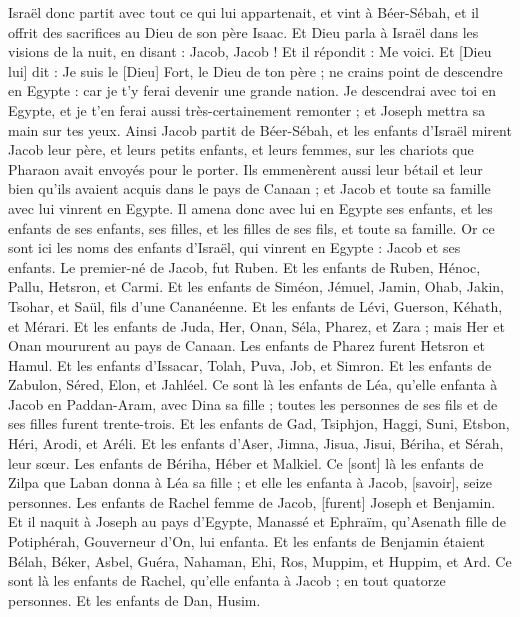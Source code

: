 \begin{multicols}{2}
\VerseOne{}Israël donc partit avec tout ce qui lui appartenait, et vint à Béer-Sébah, et il offrit des sacrifices au Dieu de son père Isaac.
Et Dieu parla à Israël dans les visions de la nuit, en disant : Jacob, Jacob ! Et il répondit : Me voici.
Et [Dieu lui] dit : Je suis le [Dieu] Fort, le Dieu de ton père ; ne crains point de descendre en Egypte : car je t'y ferai devenir une grande nation.
Je descendrai avec toi en Egypte, et je t'en ferai aussi très-certainement remonter ; et Joseph mettra sa main sur tes yeux.
Ainsi Jacob partit de Béer-Sébah, et les enfants d'Israël mirent Jacob leur père, et leurs petits enfants, et leurs femmes, sur les chariots que Pharaon avait envoyés pour le porter.
Ils emmenèrent aussi leur bétail et leur bien qu'ils avaient acquis dans le pays de Canaan ; et Jacob et toute sa famille avec lui vinrent en Egypte.
Il amena donc avec lui en Egypte ses enfants, et les enfants de ses enfants, ses filles, et les filles de ses fils, et toute sa famille.
Or ce sont ici les noms des enfants d'Israël, qui vinrent en Egypte : Jacob et ses enfants. Le premier-né de Jacob, fut Ruben.
Et les enfants de Ruben, Hénoc, Pallu, Hetsron, et Carmi.
Et les enfants de Siméon, Jémuel, Jamin, Ohab, Jakin, Tsohar, et Saül, fils d'une Cananéenne.
Et les enfants de Lévi, Guerson, Kéhath, et Mérari.
Et les enfants de Juda, Her, Onan, Séla, Pharez, et Zara ; mais Her et Onan moururent au pays de Canaan. Les enfants de Pharez furent Hetsron et Hamul.
Et les enfants d'Issacar, Tolah, Puva, Job, et Simron.
Et les enfants de Zabulon, Séred, Elon, et Jahléel.
Ce sont là les enfants de Léa, qu'elle enfanta à Jacob en Paddan-Aram, avec Dina sa fille ; toutes les personnes de ses fils et de ses filles furent trente-trois.
Et les enfants de Gad, Tsiphjon, Haggi, Suni, Etsbon, Héri, Arodi, et Aréli.
Et les enfants d'Aser, Jimna, Jisua, Jisui, Bériha, et Sérah, leur sœur. Les enfants de Bériha, Héber et Malkiel.
Ce [sont] là les enfants de Zilpa que Laban donna à Léa sa fille ; et elle les enfanta à Jacob, [savoir], seize personnes.
Les enfants de Rachel femme de Jacob, [furent] Joseph et Benjamin.
Et il naquit à Joseph au pays d'Egypte, Manassé et Ephraïm, qu'Asenath fille de Potiphérah, Gouverneur d'On, lui enfanta.
Et les enfants de Benjamin étaient Bélah, Béker, Asbel, Guéra, Nahaman, Ehi, Ros, Muppim, et Huppim, et Ard.
Ce sont là les enfants de Rachel, qu'elle enfanta à Jacob ; en tout quatorze personnes.
Et les enfants de Dan, Husim.

\end{multicols}

